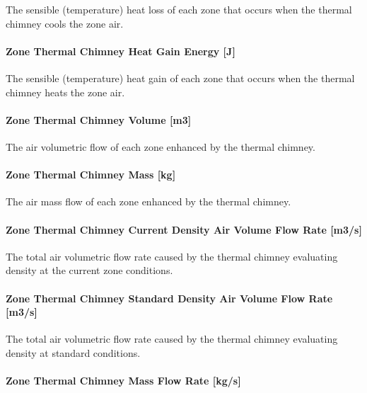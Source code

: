 The sensible (temperature) heat loss of each zone that occurs when the thermal chimney cools the zone air.

\paragraph{Zone Thermal Chimney Heat Gain Energy {[}J{]}}\label{zone-thermal-chimney-heat-gain-energy-j}

The sensible (temperature) heat gain of each zone that occurs when the thermal chimney heats the zone air.

\paragraph{Zone Thermal Chimney Volume {[}m3{]}}\label{zone-thermal-chimney-volume-m3}

The air volumetric flow of each zone enhanced by the thermal chimney.

\paragraph{Zone Thermal Chimney Mass {[}kg{]}}\label{zone-thermal-chimney-mass-kg}

The air mass flow of each zone enhanced by the thermal chimney.

\paragraph{Zone Thermal Chimney Current Density Air Volume Flow Rate {[}m3/s{]}}\label{zone-thermal-chimney-current-density-volumetric-flow-rate-m3s}

The total air volumetric flow rate caused by the thermal chimney evaluating density at the current zone conditions.

\paragraph{Zone Thermal Chimney Standard Density Air Volume Flow Rate {[}m3/s{]}}\label{zone-thermal-chimney-standard-density-volumetric-flow-rate-m3s}

The total air volumetric flow rate caused by the thermal chimney evaluating density at standard conditions.

\paragraph{Zone Thermal Chimney Mass Flow Rate {[}kg/s{]}}\label{zone-thermal-chimney-mass-flow-rate-kgs}

